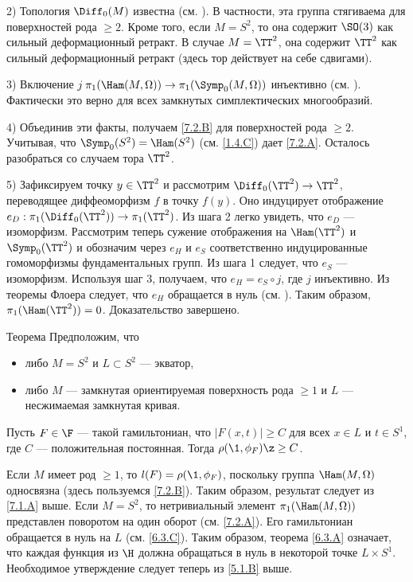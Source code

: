 2) Топология $\Diff_0 (M)$ известна (см. \cite{EE}).
В частности, эта группа стягиваема для поверхностей рода $\ge 2$.
Кроме того, если $M = S^2$, то она содержит $\SO (3)$ как сильный деформационный ретракт.
В случае $M = \TT^2$, она содержит $\TT^2$ как сильный деформационный ретракт (здесь тор действует на себе сдвигами).

3) Включение $j\: \pi_1 (\Ham (M, \Omega)) \to \pi_1 (\Symp_0 (M, \Omega))$ инъективно (см. \cite[10.18 iii]{MS}).
Фактически это верно для всех замкнутых симплектических многообразий.

4) Объединив эти факты, получаем \ref{7.2.B} для поверхностей рода $\ge 2$.
Учитывая, что $\Symp_0 (S^2) = \Ham (S^2)$ (см. \ref{1.4.C}) дает \ref{7.2.A}.
Осталось разобраться со случаем тора $\TT^2$.

5) Зафиксируем точку $y \in \TT^2$ и рассмотрим  $\Diff_0 (\TT^2) \to \TT^2$, переводящее диффеоморфизм $f$ в точку $f(y)$.
Оно индуцирует отображение $e_D: \pi_1 (\Diff_0 (\TT^2)) \to \pi_1 (\TT^2)$.
Из шага 2 легко увидеть, что $e_D$ --- изоморфизм.
Рассмотрим теперь сужение  отображения на $\Ham (\TT^2)$ и $\Symp_0 (\TT^2)$ и обозначим через $e_H$ и $e_S$ соответственно индуцированные гомоморфизмы фундаментальных групп.
Из шага 1 следует, что $e_S$ --- изоморфизм.
Используя шаг 3, получаем, что $e_H = e_S \circ j$, где $j$ инъективно.
Из теоремы Флоера следует, что $e_H$ обращается в нуль (см. \cite{LMP1}).
Таким образом, $\pi_1 (\Ham (\TT^2)) = 0$.
Доказательство завершено. 
\qeds

\begin{thm}[(\cite{P5})]{Теорема}\label{7.2.C}
Предположим, что 
\begin{itemize}
\item либо $M = S^2$ и $L \subset S^2$ --- экватор, 
\item либо $M$ --- замкнутая ориентируемая поверхность рода $\ge 1$ и $L$ --- несжимаемая замкнутая кривая.
\end{itemize}
Пусть $F \in \F$ --- такой гамильтониан, что $|F(x,t)| \ge C$ для всех $x \in L$ и $t \in S^1$, где $C$ --- положительная постоянная.
Тогда $\rho (\1, \phi_F) \z\ge C$.
\end{thm}

Если $M$ имеет род $\ge 1$, то $l (F) = \rho (\1, \phi_F)$, поскольку группа $\Ham (M, \Omega)$ односвязна (здесь пользуемся \ref{7.2.B}).
Таким образом, результат следует из \ref{7.1.A} выше.
Если $M = S^2$, то нетривиальный элемент $\pi_1 (\Ham (M, \Omega))$ представлен поворотом на один оборот (см. \ref{7.2.A}).
Его гамильтониан обращается в нуль на $L$ (см. \ref{6.3.C}).
Таким образом, теорема \ref{6.3.A} означает, что каждая функция из $\H$ должна обращаться в нуль в некоторой точке $L \times S^1$.
Необходимое утверждение следует теперь из \ref{5.1.B} выше.
\qeds


